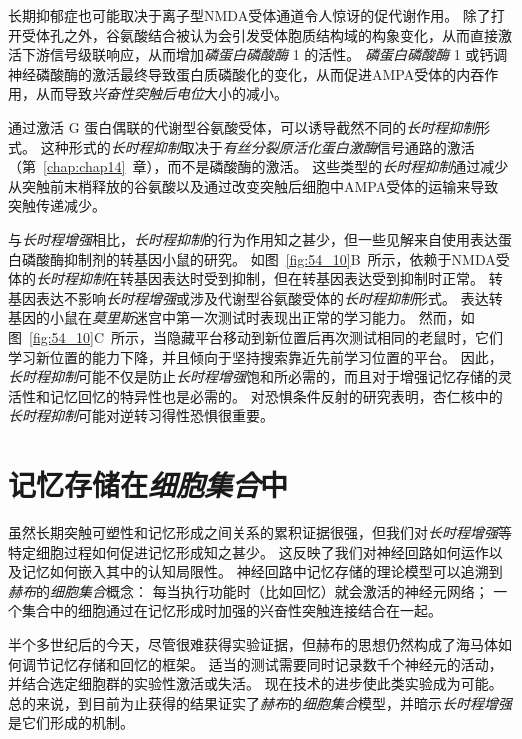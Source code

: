 长期抑郁症也可能取决于离子型NMDA受体通道令人惊讶的促代谢作用。
除了打开受体孔之外，谷氨酸结合被认为会引发受体胞质结构域的构象变化，从而直接激活下游信号级联响应，从而增加\textit{磷蛋白磷酸酶} 1 的活性。
\textit{磷蛋白磷酸酶} 1 或钙调神经磷酸酶的激活最终导致蛋白质磷酸化的变化，从而促进AMPA受体的内吞作用，从而导致\textit{兴奋性突触后电位}大小的减小。


通过激活 G 蛋白偶联的代谢型谷氨酸受体，可以诱导截然不同的\textit{长时程抑制}形式。
这种形式的\textit{长时程抑制}取决于\textit{\textit{有丝分裂原活化蛋白激酶}}信号通路的激活（第~\ref{chap:chap14}~章），而不是磷酸酶的激活。
这些类型的\textit{长时程抑制}通过减少从突触前末梢释放的谷氨酸以及通过改变突触后细胞中AMPA受体的运输来导致突触传递减少。


与\textit{长时程增强}相比，\textit{长时程抑制}的行为作用知之甚少，但一些见解来自使用表达蛋白磷酸酶抑制剂的转基因小鼠的研究。
如图~\ref{fig:54_10}B~所示，依赖于NMDA受体的\textit{长时程抑制}在转基因表达时受到抑制，但在转基因表达受到抑制时正常。
转基因表达不影响\textit{长时程增强}或涉及代谢型谷氨酸受体的\textit{长时程抑制}形式。
表达转基因的小鼠在\textit{莫里斯}迷宫中第一次测试时表现出正常的学习能力。
然而，如图~\ref{fig:54_10}C~所示，当隐藏平台移动到新位置后再次测试相同的老鼠时，它们学习新位置的能力下降，并且倾向于坚持搜索靠近先前学习位置的平台。
因此，\textit{长时程抑制}可能不仅是防止\textit{长时程增强}饱和所必需的，而且对于增强记忆存储的灵活性和记忆回忆的特异性也是必需的。
对恐惧条件反射的研究表明，杏仁核中的\textit{长时程抑制}可能对逆转习得性恐惧很重要。



\section{记忆存储在\textit{细胞集合}中}

虽然长期突触可塑性和记忆形成之间关系的累积证据很强，但我们对\textit{长时程增强}等特定细胞过程如何促进记忆形成知之甚少。
这反映了我们对神经回路如何运作以及记忆如何嵌入其中的认知局限性。
神经回路中记忆存储的理论模型可以追溯到\textit{赫布}的\textit{细胞集合}概念：
每当执行功能时（比如回忆）就会激活的神经元网络；
一个集合中的细胞通过在记忆形成时加强的兴奋性突触连接结合在一起。


半个多世纪后的今天，尽管很难获得实验证据，但赫布的思想仍然构成了海马体如何调节记忆存储和回忆的框架。
适当的测试需要同时记录数千个神经元的活动，并结合选定细胞群的实验性激活或失活。
现在技术的进步使此类实验成为可能。
总的来说，到目前为止获得的结果证实了\textit{赫布}的\textit{细胞集合}模型，并暗示\textit{长时程增强}是它们形成的机制。


